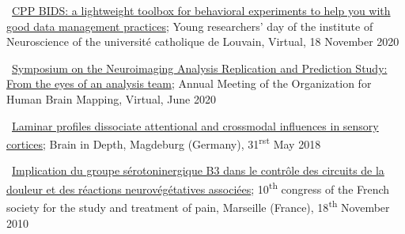 \textbullet~\href{https://osf.io/y7cjn/}{CPP BIDS: a lightweight toolbox for behavioral experiments to help you with good data management practices};
Young researchers' day of the institute of Neuroscience of the université catholique de Louvain,
Virtual,
18 November 2020

\textbullet~\href{https://osf.io/b8p9e/}{Symposium on the Neuroimaging Analysis
Replication and Prediction Study: From the eyes of an analysis team};
Annual Meeting of the Organization for Human Brain Mapping,
Virtual,
June 2020


\textbullet~\href{https://osf.io/b8p9e/}{Laminar profiles dissociate attentional and crossmodal influences in sensory cortices};
Brain in Depth,
Magdeburg (Germany),
31\textsuperscript{rst} May 2018

\textbullet~\href{https://osf.io/r7gfm/}{Implication du groupe sérotoninergique B3 dans le contrôle des circuits de la douleur et des réactions neurovégétatives associées};
10\textsuperscript{th} congress of the French society for the study and treatment of pain,
Marseille (France),
18\textsuperscript{th} November 2010
